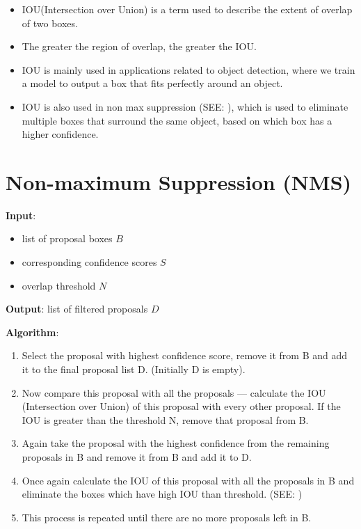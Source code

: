 \begin{itemize}
    \item IOU(Intersection over Union) is a term used to describe the extent of overlap of two boxes. 
    
    \item The greater the region of overlap, the greater the IOU.

    \item IOU is mainly used in applications related to object detection, where we train a model to output a box that fits perfectly around an object.

    \item IOU is also used in non max suppression (SEE: ), which is used to eliminate multiple boxes that surround the same object, based on which box has a higher confidence.
\end{itemize}




\section{Non-maximum Suppression (NMS) \cite{medium/towardsdatascience.com/non-maximum-suppression-nms-93ce178e177c}}\label{Non-maximum Suppression (NMS)}

\textbf{Input}:
\begin{itemize}
    \item list of proposal boxes $B$

    \item corresponding confidence scores $S$
    
    \item overlap threshold $N$
\end{itemize}

\noindent \textbf{Output}: list of filtered proposals $D$

\vspace{0.2cm}
\noindent \textbf{Algorithm}:
\begin{enumerate}
    \item Select the proposal with highest confidence score, remove it from B and add it to the final proposal list D. (Initially D is empty).

    \item Now compare this proposal with all the proposals — calculate the IOU (Intersection over Union) of this proposal with every other proposal. If the IOU is greater than the threshold N, remove that proposal from B.

    \item Again take the proposal with the highest confidence from the remaining proposals in B and remove it from B and add it to D.

    \item Once again calculate the IOU of this proposal with all the proposals in B and eliminate the boxes which have high IOU than threshold. (SEE: )

    \item This process is repeated until there are no more proposals left in B.

\end{enumerate}

